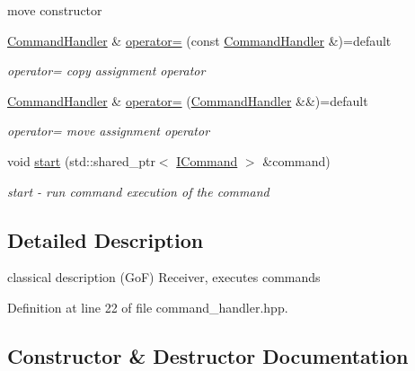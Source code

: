 \begin{DoxyCompactItemize}
\begin{DoxyCompactList}
\begin{DoxyItemize}
\item move constructor 
\end{DoxyItemize}\end{DoxyCompactList}\item 
\hyperlink{classmin__path_1_1command__handler_1_1_command_handler}{Command\+Handler} \& \hyperlink{classmin__path_1_1command__handler_1_1_command_handler_ae6548e23d4d81d26a6b1378b1581789d}{operator=} (const \hyperlink{classmin__path_1_1command__handler_1_1_command_handler}{Command\+Handler} \&)=default
\begin{DoxyCompactList}\small\item\em operator= copy assignment operator \end{DoxyCompactList}\item 
\hyperlink{classmin__path_1_1command__handler_1_1_command_handler}{Command\+Handler} \& \hyperlink{classmin__path_1_1command__handler_1_1_command_handler_a98d4451d4b3bc4426b358d3bb9e6e61f}{operator=} (\hyperlink{classmin__path_1_1command__handler_1_1_command_handler}{Command\+Handler} \&\&)=default
\begin{DoxyCompactList}\small\item\em operator= move assignment operator \end{DoxyCompactList}\item 
void \hyperlink{classmin__path_1_1command__handler_1_1_command_handler_afd5bd770042e4ad71512bd22d47d63c5}{start} (std\+::shared\+\_\+ptr$<$ \hyperlink{classmin__path_1_1command__handler_1_1_i_command}{I\+Command} $>$ \&command)
\begin{DoxyCompactList}\small\item\em start -\/ run command execution of the command \end{DoxyCompactList}\end{DoxyCompactItemize}


\subsection{Detailed Description}
classical description (GoF) Receiver, executes commands 

Definition at line 22 of file command\+\_\+handler.\+hpp.



\subsection{Constructor \& Destructor Documentation}

